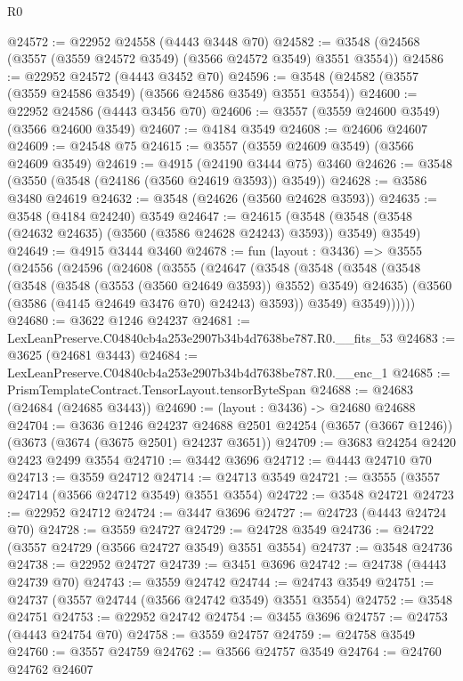 \begin{lexlean}{R0}
\begin{coremodule}
@24572 := @22952 @24558 (@4443 @3448 @70)
@24582 := @3548 (@24568 (@3557 (@3559 @24572 @3549) (@3566 @24572 @3549) @3551 @3554))
@24586 := @22952 @24572 (@4443 @3452 @70)
@24596 := @3548 (@24582 (@3557 (@3559 @24586 @3549) (@3566 @24586 @3549) @3551 @3554))
@24600 := @22952 @24586 (@4443 @3456 @70)
@24606 := @3557 (@3559 @24600 @3549) (@3566 @24600 @3549)
@24607 := @4184 @3549
@24608 := @24606 @24607
@24609 := @24548 @75
@24615 := @3557 (@3559 @24609 @3549) (@3566 @24609 @3549)
@24619 := @4915 (@24190 @3444 @75) @3460
@24626 := @3548 (@3550 (@3548 (@24186 (@3560 @24619 @3593)) @3549))
@24628 := @3586 @3480 @24619
@24632 := @3548 (@24626 (@3560 @24628 @3593))
@24635 := @3548 (@4184 @24240) @3549
@24647 := @24615
    (@3548 (@3548 (@3548 (@24632 @24635) (@3560 (@3586 @24628 @24243) @3593)) @3549) @3549)
@24649 := @4915 @3444 @3460
@24678 := fun (layout : @3436) =>
  @3555
    (@24556
      (@24596
        (@24608
          (@3555
            (@24647
              (@3548
                (@3548
                  (@3548
                    (@3548 (@3548 (@3548 (@3553 (@3560 @24649 @3593)) @3552) @3549) @24635)
                    (@3560 (@3586 (@4145 @24649 @3476 @70) @24243) @3593))
                  @3549)
                @3549))))))
@24680 := @3622 @1246 @24237
@24681 := LexLeanPreserve.C04840cb4a253e2907b34b4d7638be787.R0.__fits_53
@24683 := @3625 (@24681 @3443)
@24684 := LexLeanPreserve.C04840cb4a253e2907b34b4d7638be787.R0.__enc_1
@24685 := PrismTemplateContract.TensorLayout.tensorByteSpan
@24688 := @24683 (@24684 (@24685 @3443))
@24690 := (layout : @3436) -> @24680 @24688
@24704 := @3636
    @1246
    @24237
    @24688
    @2501
    @24254
    (@3657 (@3667 @1246))
    (@3673 (@3674 (@3675 @2501) @24237 @3651))
@24709 := @3683 @24254 @2420 @2423 @2499 @3554
@24710 := @3442 @3696
@24712 := @4443 @24710 @70
@24713 := @3559 @24712
@24714 := @24713 @3549
@24721 := @3555 (@3557 @24714 (@3566 @24712 @3549) @3551 @3554)
@24722 := @3548 @24721
@24723 := @22952 @24712
@24724 := @3447 @3696
@24727 := @24723 (@4443 @24724 @70)
@24728 := @3559 @24727
@24729 := @24728 @3549
@24736 := @24722 (@3557 @24729 (@3566 @24727 @3549) @3551 @3554)
@24737 := @3548 @24736
@24738 := @22952 @24727
@24739 := @3451 @3696
@24742 := @24738 (@4443 @24739 @70)
@24743 := @3559 @24742
@24744 := @24743 @3549
@24751 := @24737 (@3557 @24744 (@3566 @24742 @3549) @3551 @3554)
@24752 := @3548 @24751
@24753 := @22952 @24742
@24754 := @3455 @3696
@24757 := @24753 (@4443 @24754 @70)
@24758 := @3559 @24757
@24759 := @24758 @3549
@24760 := @3557 @24759
@24762 := @3566 @24757 @3549
@24764 := @24760 @24762 @24607

\end{coremodule}
\end{lexlean}

